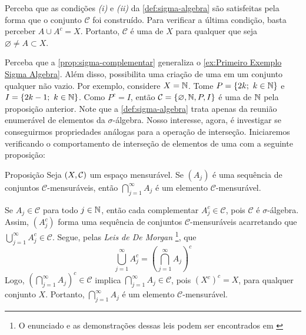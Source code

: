 \begin{prova}
    Perceba que as condições \textit{(i)} e \textit{(ii)} da  \ref{def:sigma-algebra} são satisfeitas pela forma que o conjunto  $\mathcal{C}$ foi construído. Para verificar a última condição, basta perceber $A \cup A^c = X$. Portanto, $\mathcal{C}$ é uma \sigal de $X$ para qualquer que seja $ \varnothing \neq A \subset X$.
\end{prova}

Perceba que a \ref{prop:sigma-complementar} generaliza o \ref{ex:Primeiro Exemplo Sigma Algebra}. Além disso, possibilita uma criação de uma \sigal em um conjunto qualquer não vazio.
Por exemplo, considere $X = \operatorname{\mathbb{N}}$.
Tome $P =\{2k; \ k \in \operatorname{\mathbb{N}}\}$ e $I = \{2k - 1;\ k \in \N\}$.
Como $P^c = I$, então $\mathcal{C} = \{\varnothing, \operatorname{\mathbb{N}}, P, I\}$ é uma \sigal de $\operatorname{\mathbb{N}}$ pela proposição anterior.
Note que a  \ref{def:sigma-algebra} trata apenas da reunião enumerável de elementos da $\sigma$-álgebra. 
Nosso interesse, agora, é investigar se conseguirmos propriedades análogas para a operação de interseção. 
Iniciaremos verificando o comportamento de interseção de elementos de uma \sigal com a seguinte proposição:

\begin{env}{Proposição}
\label{prop:interseção-elementos-sigmas}
    Seja $(X, \operatorname{\mathcal{C}})$ um espaço mensurável.
    Se $(A_j)$ é uma sequência  de conjuntos $\mathcal{C} $-mensuráveis, então $\displaystyle \bigcap_{j = 1}^\infty A_j$ é um elemento $\mathcal{C}$-mensurável.
\end{env}
\begin{prova}
    Se $A_j \in \mathcal{C}$ para todo $j \in \operatorname{\mathbb{N}}$, então cada complementar $A_j^c \in \mathcal{C}$, pois $\mathcal{C}$ é $\sigma$-álgebra. 
    Assim, $(A_j^c)$ forma uma sequência de conjuntos $\mathcal{C}$-mensuráveis acarretando que 
    $\displaystyle \bigcup_{j = 1}^\infty A_j^c \in \mathcal{C}$. 
    Segue, pelas \textit{Leis de De Morgan}
    \footnote{O enunciado e as demonstrações dessas leis podem ser encontrados em \cite[p.26]{elon}}, que 
    $$
    \displaystyle \bigcup_{j = 1}^\infty A_j^c 
    = \left(\displaystyle \bigcap_{j = 1}^\infty A_j\right)^c
  	$$
	Logo, $\left(\displaystyle \bigcap_{j = 1}^\infty A_j\right)^c \in \mathcal{C}$ implica $\displaystyle \bigcap_{j = 1}^\infty A_j \in \mathcal{C}$, pois $(X^c)^c = X$, para qualquer conjunto $X$.
	Portanto, $\displaystyle \bigcap_{j = 1}^\infty A_j$ é um elemento $\mathcal{C}$-mensurável.
\end{prova}

